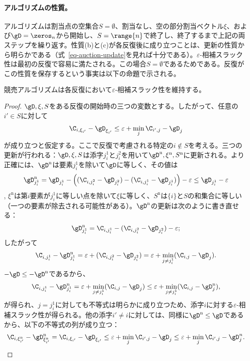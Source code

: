 \paragraph{アルゴリズムの性質。} アルゴリズムは割当点の空集合$S=\emptyset$、割当なし、空の部分割当ベクトル$\xi$、および$\gD=\zeros_n$から開始し、$S=\range{n}$で終了し、終了するまで上記の両ステップを繰り返す。性質{(b)}と{(c)}が各反復後に成り立つことは、更新の性質から明らかである（式~\eqref{eq-auction-update}を見れば十分である）。$\varepsilon$-相補スラック性は最初の反復で容易に満たされる。この場合$S=\emptyset$であるためである。反復がこの性質を保存するという事実は以下の命題で示される。
\begin{prop} 競売アルゴリズムは各反復において$\varepsilon$-相補スラック性を維持する。
\end{prop}
\begin{proof}
	$\gD,\xi,S$をある反復の開始時の三つの変数とする。したがって、任意の$i'\in S$に対して
	$$\C_{i,\xi_{i'}} - \gD_{\xi_{i'}}  \leq \varepsilon + \min_{j} \C_{{i'},j} - \gD_{j} $$
が成り立つと仮定する。ここで反復で考慮される特定の$i\notin S$を考える。三つの更新が行われる：$\gD,\xi,S$は添字$j^1_i$と$j^2_i$を用いて$\gD^{\text{n}},\xi^{\text{n}},S^{\text{n}}$に更新される。より正確には、$\gD^{\text{n}}$は要素$j^1_i$を除いて$\gD$に等しく、その値は
$$\gD_{j^1_{i}}^\text{n} = \gD_{j^1_{i}} - \left((\C_{i,j^2_{i}}-\gD_{j^2_{i}})-(\C_{i,j^1_{i}}-\gD_{j^1_{i}})\right)-\varepsilon \leq \gD_{j^1_{i}}-\varepsilon$$,
$\xi^{\text{n}}$は第$i$要素が$j^1_i$に等しい点を除いて$\xi$に等しく、$S^{\text{n}}$は$\{i\}$と$S$の和集合に等しい（一つの要素が除去される可能性がある）。$\gD^{\text{n}}$の更新は次のように書き直せる：
$$\gD^{\text{n}}_{j^1_i}= \C_{i,j^1_{i}} - (\C_{i,j^2_{i}}-\gD_{j^2_{i}}) -\varepsilon;$$
したがって
$$\C_{i,j^1_{i}} - \gD^{\text{n}}_{j^1_i}=  \varepsilon + (\C_{i,j^2_{i}}-\gD_{j^2_{i}}) = \varepsilon+\min_{j\ne j^1_i} (\C_{i,j}-\gD_{j}).$$
$-\gD\leq -\gD^{\text{n}}$であるから、
$$\C_{i,j^1_{i}} - \gD^{\text{n}}_{j^1_i} = \varepsilon + \min_{j\ne j^1_i} (\C_{i,j}-\gD_{j})\leq \varepsilon+\min_{j\ne j^1_i} (\C_{i,j}-\gD^{\text{n}}_{j}),$$
が得られ、$j=j^1_i$に対しても不等式は明らかに成り立つため、添字$i$に対する$\varepsilon$-相補スラック性が得られる。他の添字$i'\ne i$に対しては、同様に$\gD^{\text{n}}\leq\gD$であるから、以下の不等式の列が成り立つ：
$$\C_{i,\xi^{\text{n}}_{i'}} - \gD^{\text{n}}_{\xi^{\text{n}}_{i'}} = \C_{i,\xi_{i'}} - \gD_{\xi_{i'}} \leq \varepsilon + \min_{j} \C_{{i'},j} - \gD_{j} \leq \varepsilon + \min_{j} \C_{{i'},j} - \gD^{n}_{j}. $$
\end{proof}

